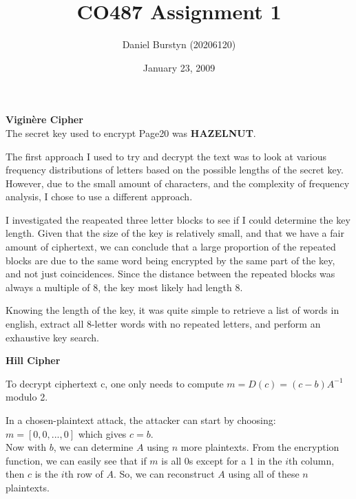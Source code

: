 \documentclass[12pt]{article}
\title{CO487 Assignment 1}
\author{Daniel Burstyn (20206120)}
\date{January 23, 2009}
\begin{document}
\maketitle
{}
\begin{list}{.}{}

\item \textbf{Vigin\`{e}re Cipher}\\
The secret key used to encrypt Page20 was \textbf{HAZELNUT}.

The first approach I used to try and decrypt the text was to look at various
frequency distributions of letters based on the possible lengths of the secret
key.  However, due to the small amount of characters, and the complexity of
frequency analysis, I chose to use a different approach.

I investigated the reapeated three letter blocks to see if I could determine the
key length.  Given that the size of the key is relatively small, and that we
have a fair amount of ciphertext, we can conclude that a large proportion of the
repeated blocks are due to the same word being encrypted by the same part of the
key, and not just coincidences.  Since the distance between the repeated blocks
was always a multiple of 8, the key most likely had length 8.

Knowing the length of the key, it was quite simple to retrieve a list of words
in english, extract all 8-letter words with no repeated letters, and perform an
exhaustive key search.

\item \textbf{Hill Cipher}
\begin{list}{()}{}
\item To decrypt ciphertext c, one only needs to compute
$m = D(c) = (c - b)A^{-1}$ modulo 2.

\item In a chosen-plaintext attack, the attacker can start by choosing:\\
$m = [ 0,0,...,0 ]$ which gives $c = b$.\\
Now with $b$, we can determine $A$ using $n$ more plaintexts.  From the
encryption function, we can easily see that if $m$ is all 0s except for a 1 in
the $i$th column, then $c$ is the $i$th row of $A$.  So, we can reconstruct $A$
using all of these $n$ plaintexts.


\end{list}
\end{list}
\end{document}
